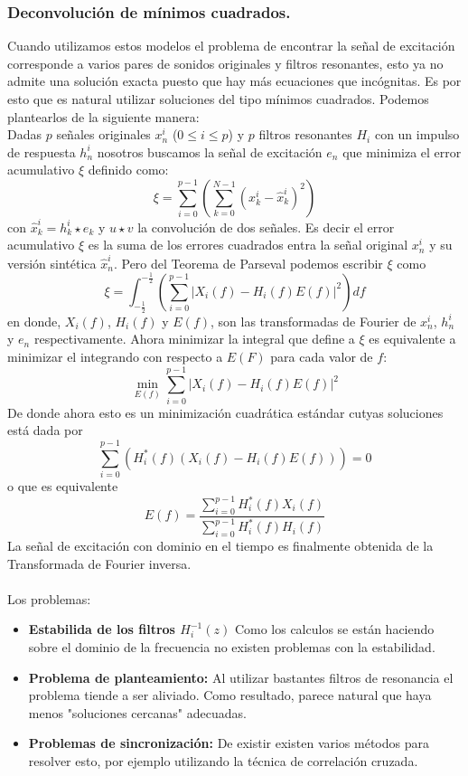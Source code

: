 \documentclass[11pt]{amsart}
\theoremstyle{plain}
\theoremstyle{definition}
\begin{document}
\subsubsection{Deconvolución de mínimos cuadrados.} Cuando utilizamos estos modelos el problema de encontrar la señal de excitación corresponde a varios pares de sonidos originales y filtros resonantes, esto ya no admite una solución exacta puesto que hay más ecuaciones que incógnitas. Es por esto que es natural utilizar soluciones del tipo mínimos cuadrados. Podemos plantearlos de la siguiente manera: \\
Dadas $p$ señales originales $x_n^{i}$ ($0 \leq i \leq p$) y $p$ filtros resonantes $H_i$ con un impulso de respuesta $h_n^{i}$ nosotros buscamos la señal de excitación $e_n$ que minimiza el error acumulativo $\xi$ definido como:
$$
\xi=\sum_{i=0}^{p-1}\left( \sum_{k=0}^{N-1}(x_k^{i}-\hat{x}_k^{i})^2 \right)
$$
con $\hat{x}_k^{i}=h_k^{i} \star e_k$ y $u \star v$ la convolución de dos señales. Es decir el error acumulativo $\xi$ es la suma de los errores cuadrados entra la señal original $x_n^{i}$ y su versión sintética $\hat{x}_n^{i}$. Pero del Teorema de Parseval podemos escribir $\xi$ como
$$
\xi=\int_{-\frac{1}{2}}^{-\frac{1}{2}}\left( \sum_{i=0}^{p-1} | X_i(f)-H_i(f)E(f)|^2\right)df
$$
en donde, $X_i(f)$, $H_i(f)$ y $E(f)$, son las transformadas de Fourier de $x_n^i$, $h_n^i$ y $e_n$ respectivamente. Ahora minimizar la integral que define a $\xi$ es equivalente a minimizar el integrando con respecto a $E(F)$ para cada valor de $f$:
$$
\min_{E(f)}\sum_{i=0}^{p-1}|X_i(f)-H_i(f)E(f)|^2
$$
De donde ahora esto es un minimización cuadrática estándar cutyas soluciones está dada por 
$$
\sum_{i=0}^{p-1}(H_i^*(f)(X_i(f)-H_i(f)E(f)))=0
$$
o que es equivalente
$$
E(f)=\dfrac{\sum_{i=0}^{p-1}H_i^*(f)X_i(f)}{\sum_{i=0}^{p-1}H_i^*(f)H_i(f)}
$$
La señal de excitación con dominio en el tiempo es finalmente obtenida de la Transformada de Fourier inversa. \\ \\
Los problemas:
\begin{itemize}
\item \textbf{Estabilida de los filtros $H_i^{-1}(z)$} 
Como los calculos se están haciendo sobre el dominio de la frecuencia no existen problemas con la estabilidad.

\item \textbf{Problema de planteamiento:} Al utilizar bastantes filtros de resonancia el problema tiende a ser aliviado. Como resultado, parece natural que haya menos "soluciones cercanas" adecuadas.
\item \textbf{Problemas de sincronización:} De existir existen varios métodos para resolver esto, por ejemplo utilizando la técnica de correlación cruzada.
\end{itemize}
\end{document}

